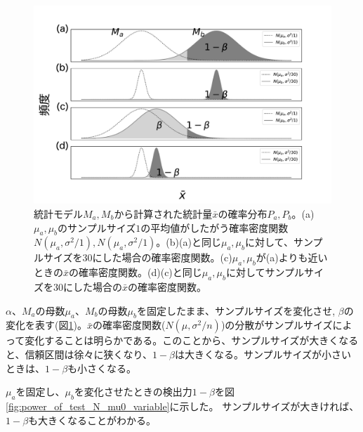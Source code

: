 \begin{figure}
    \begin{center}
        \includegraphics[width=15cm]{./image/04_/power_of_a_test_3.pdf}
        \caption{統計モデル$M_a,M_b$から計算された統計量$\bar{x}$の確率分布$P_a,P_b$。(a)$\mu_a,\mu_b$のサンプルサイズ$1$の平均値がしたがう確率密度関数$N(\mu_a,\sigma^2/1),N(\mu_a,\sigma^2/1)$。(b)(a)と同じ$\mu_a,\mu_b$に対して、サンプルサイズを$30$にした場合の確率密度関数。(c)$\mu_a,\mu_b$が(a)よりも近いときの$\bar{x}$の確率密度関数。(d)(c)と同じ$\mu_a,\mu_b$に対してサンプルサイズを$30$にした場合の$\bar{x}$の確率密度関数。}
        \label{fig:power_of_test_alpha_beta_sample_size}
    \end{center}
    \end{figure}

    

$\alpha$、$M_a$の母数$\mu_a$、$M_b$の母数$\mu_b$を固定したまま、サンプルサイズを変化させ,
$\beta$の変化を表す(図\ref{fig:power_of_test_alpha_beta_sample_size})。$\bar{x}$の確率密度関数($N(\mu,\sigma^2/n)$)の分散がサンプルサイズによって変化することは明らかである。このことから、サンプルサイズが大きくなると、信頼区間は徐々に狭くなり、$1-\beta$は大きくなる。サンプルサイズが小さいときは、$1-\beta$も小さくなる。

$\mu_a$を固定し、$\mu_b$を変化させたときの検出力$1-\beta$を図\ref{fig:power_of_test_N_mu0_variable}に示した。
サンプルサイズが大きければ、$1-\beta$も大きくなることがわかる。

